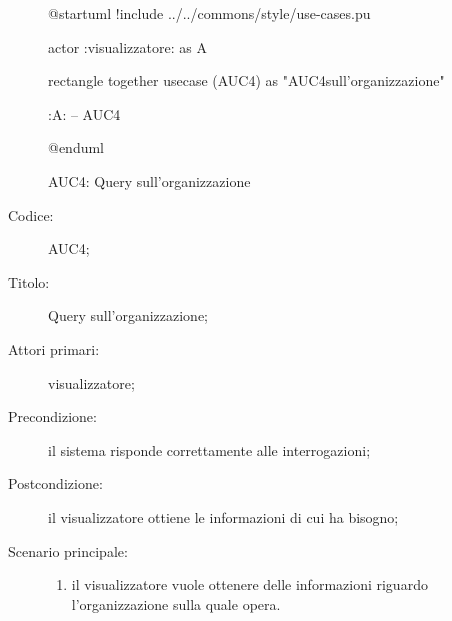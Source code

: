 \documentclass[../../../analisi-dei-requisiti.tex]{subfiles}
\begin{document}
\begin{figure}[H]
  \centering
  \begin{plantuml}
  @startuml
  !include ../../commons/style/use-cases.pu

  actor :visualizzatore: as A

  rectangle {
    together {
      usecase (AUC4) as "AUC4\nQuery sull'organizzazione"
    }
  }

  :A: -- AUC4

  @enduml
  \end{plantuml}
  \caption{AUC4: Query sull'organizzazione}%
  \label{fig:AUC4}
\end{figure}

\begin{description}
  \item[Codice:] AUC4;
  \item[Titolo:] Query sull'organizzazione;
  \item[Attori primari:] visualizzatore;
  \item[Precondizione:] il sistema risponde correttamente alle interrogazioni;
  \item[Postcondizione:] il visualizzatore ottiene le informazioni di cui ha bisogno;
  \item[Scenario principale:]
  \begin{enumerate}
    \item il visualizzatore vuole ottenere delle informazioni riguardo l'organizzazione sulla quale opera.
  \end{enumerate}
\end{description}
\end{document}
